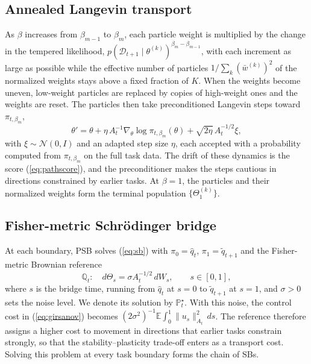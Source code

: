 \subsection{Annealed Langevin transport}
\label{sec:langevin}

As $\beta$ increases from $\beta_{m-1}$ to $\beta_m$, each particle weight is
multiplied by the change in the tempered likelihood,
$p(\mathcal{D}_{t+1}\mid\theta^{(k)})^{\beta_m-\beta_{m-1}}$, with each increment
as large as possible while the effective number of particles
$1/\sum_k(\bar w^{(k)})^2$ of the normalized weights stays above a fixed
fraction of $K$. When the weights become uneven, low-weight particles are
replaced by copies of high-weight ones and the weights are reset. The particles
then take preconditioned Langevin steps toward $\pi_{t,\beta_m}$,
\begin{equation}
    \theta'=\theta+\eta\,A_t^{-1}\nabla_\theta\log\pi_{t,\beta_m}(\theta)
    +\sqrt{2\eta}\,A_t^{-1/2}\xi,
    \label{eq:mala}
\end{equation}
with $\xi\sim\mathcal{N}(0,I)$ and an adapted step size $\eta$, each accepted
with a probability computed from $\pi_{t,\beta_m}$ on the full task data. The
drift of these dynamics is the score (\ref{eq:pathscore}), and the
preconditioner makes the steps cautious in directions constrained by earlier
tasks. At $\beta=1$, the particles and their normalized weights form the
terminal population $\{\Theta_1^{(k)}\}$.

\subsection{Fisher-metric Schr\"odinger bridge}
\label{sec:bridge}

At each boundary, PSB solves (\ref{eq:sb}) with $\pi_0=\hat q_t$,
$\pi_1=\tilde q_{t+1}$ and the Fisher-metric Brownian reference
\begin{equation}
    \mathbb{Q}_t:\quad d\Theta_s=\sigma A_t^{-1/2}\,dW_s,\qquad s\in[0,1],
    \label{eq:fisherreference}
\end{equation}
where $s$ is the bridge time, running from $\hat q_t$ at $s=0$ to
$\tilde q_{t+1}$ at $s=1$, and $\sigma>0$ sets the noise level. We denote its
solution by
$\mathbb{P}^\star_t$. With this noise, the control cost in (\ref{eq:girsanov})
becomes $(2\sigma^2)^{-1}\mathbb{E}\int_0^1\|u_s\|_{A_t}^2\,ds$. The reference
therefore assigns a higher cost to movement in directions that earlier tasks
constrain strongly, so that the stability--plasticity trade-off enters as a
transport cost. Solving this problem at every task boundary forms the chain of
SBs.

